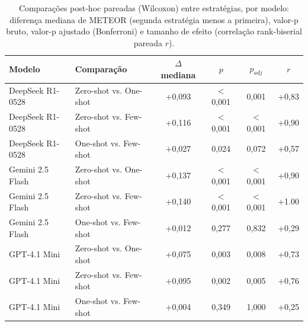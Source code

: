 \begin{table}[ht]
\centering
\caption{Comparações post-hoc pareadas (Wilcoxon) entre estratégias, por modelo: diferença mediana de METEOR (segunda estratégia menos a primeira), valor-p bruto, valor-p ajustado (Bonferroni) e tamanho de efeito (correlação rank-biserial pareada $r$).}
\label{tab:posthoc}
\footnotesize
\begin{tabular}{llcccc}
\hline
\textbf{Modelo} & \textbf{Comparação} & \textbf{$\Delta$ mediana} & \textbf{$p$} & \textbf{$p_{adj}$} & \textbf{$r$} \\
\hline
DeepSeek R1-0528 & Zero-shot vs. One-shot & +0,093 & $<$0,001 & 0,001 & +0,83 \\
DeepSeek R1-0528 & Zero-shot vs. Few-shot & +0,116 & $<$0,001 & $<$0,001 & +0,90 \\
DeepSeek R1-0528 & One-shot vs. Few-shot & +0,027 & 0,024 & 0,072 & +0,57 \\
Gemini 2.5 Flash & Zero-shot vs. One-shot & +0,137 & $<$0,001 & $<$0,001 & +0,90 \\
Gemini 2.5 Flash & Zero-shot vs. Few-shot & +0,140 & $<$0,001 & $<$0,001 & +1.00 \\
Gemini 2.5 Flash & One-shot vs. Few-shot & +0,012 & 0,277 & 0,832 & +0,29 \\
GPT-4.1 Mini & Zero-shot vs. One-shot & +0,075 & 0,003 & 0,008 & +0,73 \\
GPT-4.1 Mini & Zero-shot vs. Few-shot & +0,095 & 0,002 & 0,005 & +0,76 \\
GPT-4.1 Mini & One-shot vs. Few-shot & +0,004 & 0,349 & 1,000 & +0,25 \\
\hline
\end{tabular}
\end{table}
